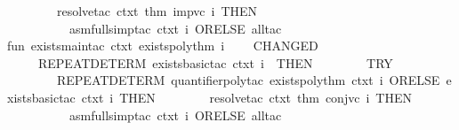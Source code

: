 \begin{isabellebody}
\ \ \ \ \ \ \ \ {\isacharparenleft}{\kern0pt}{\isacharparenleft}{\kern0pt}resolve{\isacharunderscore}{\kern0pt}tac\ ctxt\ {\isacharbrackleft}{\kern0pt}{\isacharat}{\kern0pt}{\isacharbraceleft}{\kern0pt}thm\ imp{\isacharunderscore}{\kern0pt}vc{\isacharbraceright}{\kern0pt}{\isacharbrackright}{\kern0pt}\ i\ THEN\ \isanewline
\ \ \ \ \ \ \ \ \ \ asm{\isacharunderscore}{\kern0pt}full{\isacharunderscore}{\kern0pt}simp{\isacharunderscore}{\kern0pt}tac\ ctxt\ i{\isacharparenright}{\kern0pt}\ ORELSE\ all{\isacharunderscore}{\kern0pt}tac{\isacharparenright}{\kern0pt}{\isacharparenright}{\kern0pt}\isanewline
\ \ \ \ \ \ {\isacharparenright}{\kern0pt}\isanewline
\ \ \ \ {\isacharparenright}{\kern0pt}\isanewline
\isanewline
fun\ exists{\isacharunderscore}{\kern0pt}main{\isacharunderscore}{\kern0pt}tac\ ctxt\ exists{\isacharunderscore}{\kern0pt}poly{\isacharunderscore}{\kern0pt}thm\ i\ {\isacharequal}{\kern0pt}\ \isanewline
\ \ CHANGED\isanewline
\ \ \ \ {\isacharparenleft}{\kern0pt}\ {\isacharparenleft}{\kern0pt}REPEAT{\isacharunderscore}{\kern0pt}DETERM\ {\isacharparenleft}{\kern0pt}exists{\isacharunderscore}{\kern0pt}basic{\isacharunderscore}{\kern0pt}tac\ ctxt\ i{\isacharparenright}{\kern0pt}{\isacharparenright}{\kern0pt}\ \ THEN\ {\isacharparenleft}{\kern0pt}\isanewline
\ \ \ \ \ \ \ TRY\isanewline
\ \ \ \ \ \ \ \ {\isacharparenleft}{\kern0pt}REPEAT{\isacharunderscore}{\kern0pt}DETERM{}\ {\isacharparenleft}{\kern0pt}{\isacharparenleft}{\kern0pt}quantifier{\isacharunderscore}{\kern0pt}poly{\isacharunderscore}{\kern0pt}tac\ exists{\isacharunderscore}{\kern0pt}poly{\isacharunderscore}{\kern0pt}thm\ ctxt\ i{\isacharparenright}{\kern0pt}\ ORELSE\ {\isacharparenleft}{\kern0pt}exists{\isacharunderscore}{\kern0pt}basic{\isacharunderscore}{\kern0pt}tac\ ctxt\ i{\isacharparenright}{\kern0pt}{\isacharparenright}{\kern0pt}\ THEN\isanewline
\ \ \ \ \ \ \ \ {\isacharparenleft}{\kern0pt}{\isacharparenleft}{\kern0pt}resolve{\isacharunderscore}{\kern0pt}tac\ ctxt\ {\isacharbrackleft}{\kern0pt}{\isacharat}{\kern0pt}{\isacharbraceleft}{\kern0pt}thm\ conj{\isacharunderscore}{\kern0pt}vc{\isacharbraceright}{\kern0pt}{\isacharbrackright}{\kern0pt}\ i\ THEN\ \isanewline
\ \ \ \ \ \ \ \ \ \ asm{\isacharunderscore}{\kern0pt}full{\isacharunderscore}{\kern0pt}simp{\isacharunderscore}{\kern0pt}tac\ ctxt\ i{\isacharparenright}{\kern0pt}\ ORELSE\ all{\isacharunderscore}{\kern0pt}tac{\isacharparenright}{\kern0pt}{\isacharparenright}{\kern0pt}\isanewline
\ \ \ \ \ \ {\isacharparenright}{\kern0pt}\isanewline
\ \ \ \ {\isacharparenright}{\kern0pt}\isanewline
{\isacartoucheclose}\isanewline

\end{isabellebody}
